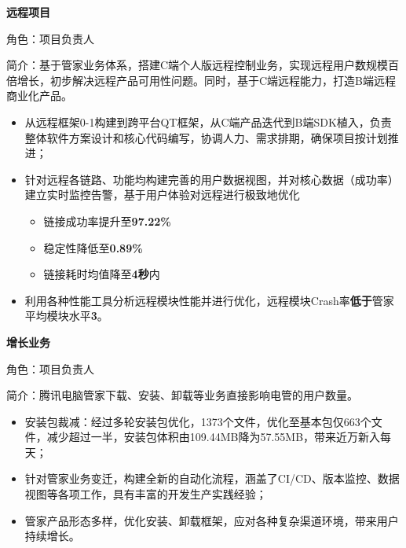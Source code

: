 \documentclass{resume}
\begin{document}
{\textbf{\large{远程项目}}}
\vspace{0.5ex}
\par{角色：项目负责人}
\par{简介：基于管家业务体系，搭建C端个人版远程控制业务，实现远程用户数规模百倍增长，初步解决远程产品可用性问题。同时，基于C端远程能力，打造B端远程商业化产品。}
\begin{itemize}[itemsep=0.4em]
  \item 从远程框架0-1构建到跨平台QT框架，从C端产品迭代到B端SDK植入，负责整体软件方案设计和核心代码编写，协调人力、需求排期，确保项目按计划推进；
  \item 针对远程各链路、功能均构建完善的用户数据视图，并对核心数据（成功率）建立实时监控告警，基于用户体验对远程进行极致地优化
	\begin{itemize}[itemsep=0.4em]
	\item 链接成功率提升至\textbf{97.22\%}
	\item 稳定性降低至\textbf{0.89\%}
	\item 链接耗时均值降至\textbf{4秒}内
	\end{itemize}
  \item 利用各种性能工具分析远程模块性能并进行优化，远程模块Crash率\textbf{低于}管家平均模块水平\textbf{3\textperthousand}。
\end{itemize}

\vspace{1.0ex}
{\textbf{\large{增长业务}}}
\vspace{0.5ex}
\par{角色：项目负责人}
\par{简介：腾讯电脑管家下载、安装、卸载等业务直接影响电管的用户数量。}
\begin{itemize}[itemsep=0.4em]
  \item 安装包裁减：经过多轮安装包优化，1373个文件，优化至基本包仅663个文件，减少超过一半，安装包体积由109.44MB降为57.55MB，带来近万新入每天；
  \item 针对管家业务变迁，构建全新的自动化流程，涵盖了CI/CD、版本监控、数据视图等各项工作，具有丰富的开发生产实践经验；
  \item 管家产品形态多样，优化安装、卸载框架，应对各种复杂渠道环境，带来用户持续增长。
\end{itemize}

\end{document}
